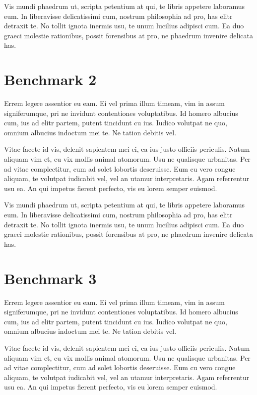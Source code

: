 \documentclass[a4paper,11pt,oneside]{report}
\begin{document}
Vis mundi phaedrum ut, scripta petentium at qui, te libris appetere laboramus
eum. In liberavisse delicatissimi cum, nostrum philosophia ad pro, has elitr
detraxit te. No tollit ignota inermis usu, te unum lucilius adipisci cum. Ea duo
graeci molestie rationibus, possit forensibus at pro, ne phaedrum invenire
delicata has.

\section{Benchmark 2}

Errem legere assentior eu eam. Ei vel prima illum timeam, vim in assum
signiferumque, pri ne invidunt contentiones voluptatibus. Id homero albucius
cum, ius ad elitr partem, putent tincidunt cu ius. Iudico volutpat ne quo,
omnium albucius indoctum mei te. Ne tation debitis vel.

Vitae facete id vis, delenit sapientem mei ei, ea ius justo officiis
periculis. Natum aliquam vim et, cu vix mollis animal atomorum. Usu ne qualisque
urbanitas. Per ad vitae complectitur, cum ad solet lobortis deseruisse. Eum cu
vero congue aliquam, te volutpat iudicabit vel, vel an utamur
interpretaris. Agam referrentur usu ea. An qui impetus fierent perfecto, vis eu
lorem semper euismod.

Vis mundi phaedrum ut, scripta petentium at qui, te libris appetere laboramus
eum. In liberavisse delicatissimi cum, nostrum philosophia ad pro, has elitr
detraxit te. No tollit ignota inermis usu, te unum lucilius adipisci cum. Ea duo
graeci molestie rationibus, possit forensibus at pro, ne phaedrum invenire
delicata has.

\section{Benchmark 3}

Errem legere assentior eu eam. Ei vel prima illum timeam, vim in assum
signiferumque, pri ne invidunt contentiones voluptatibus. Id homero albucius
cum, ius ad elitr partem, putent tincidunt cu ius. Iudico volutpat ne quo,
omnium albucius indoctum mei te. Ne tation debitis vel.

Vitae facete id vis, delenit sapientem mei ei, ea ius justo officiis
periculis. Natum aliquam vim et, cu vix mollis animal atomorum. Usu ne qualisque
urbanitas. Per ad vitae complectitur, cum ad solet lobortis deseruisse. Eum cu
vero congue aliquam, te volutpat iudicabit vel, vel an utamur
interpretaris. Agam referrentur usu ea. An qui impetus fierent perfecto, vis eu
lorem semper euismod.
\end{document}
